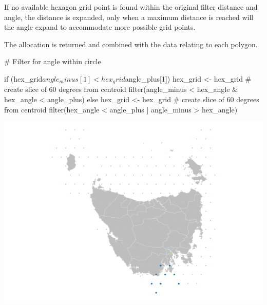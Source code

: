 If no available hexagon grid point is found within the original filter
distance and angle, the distance is expanded, only when a maximum
distance is reached will the angle expand to accommodate more possible
grid points.

The allocation is returned and combined with the data relating to each
polygon.

\begin{Schunk}
\begin{Sinput}
# Filter for angle within circle

        if (hex_grid$angle_minus[1] < hex_grid$angle_plus[1]) {
            hex_grid <- hex_grid %
                # create slice of 60 degrees from centroid
                filter(angle_minus < hex_angle & hex_angle < angle_plus)
        } else {
            hex_grid <- hex_grid %
                # create slice of 60 degrees from centroid
                filter(hex_angle < angle_plus | angle_minus > hex_angle)
        }
\end{Sinput}
\end{Schunk}

\begin{Schunk}

\includegraphics{algorithmRjournal_files/figure-latex/plot_slice-1} \end{Schunk}

